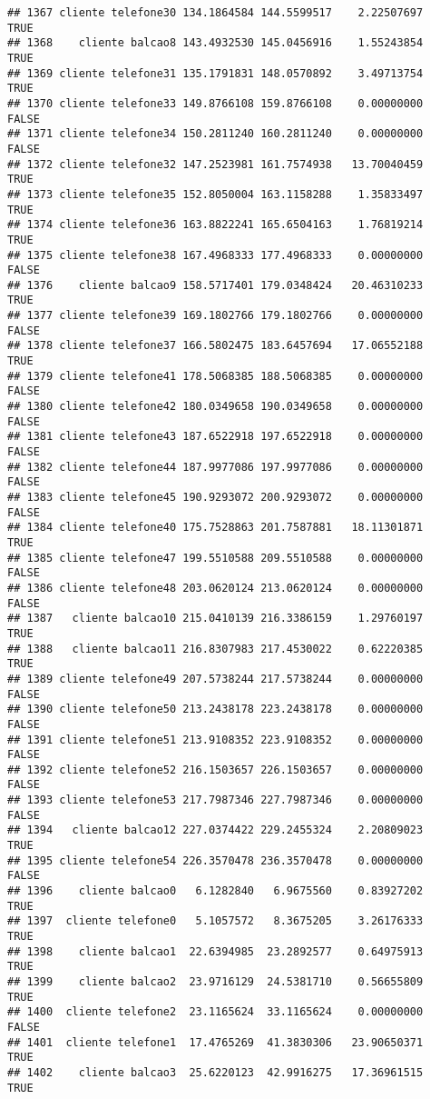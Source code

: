 \documentclass[
]{article}
\begin{document}
\begin{verbatim}
## 1367 cliente telefone30 134.1864584 144.5599517    2.22507697     TRUE
## 1368    cliente balcao8 143.4932530 145.0456916    1.55243854     TRUE
## 1369 cliente telefone31 135.1791831 148.0570892    3.49713754     TRUE
## 1370 cliente telefone33 149.8766108 159.8766108    0.00000000    FALSE
## 1371 cliente telefone34 150.2811240 160.2811240    0.00000000    FALSE
## 1372 cliente telefone32 147.2523981 161.7574938   13.70040459     TRUE
## 1373 cliente telefone35 152.8050004 163.1158288    1.35833497     TRUE
## 1374 cliente telefone36 163.8822241 165.6504163    1.76819214     TRUE
## 1375 cliente telefone38 167.4968333 177.4968333    0.00000000    FALSE
## 1376    cliente balcao9 158.5717401 179.0348424   20.46310233     TRUE
## 1377 cliente telefone39 169.1802766 179.1802766    0.00000000    FALSE
## 1378 cliente telefone37 166.5802475 183.6457694   17.06552188     TRUE
## 1379 cliente telefone41 178.5068385 188.5068385    0.00000000    FALSE
## 1380 cliente telefone42 180.0349658 190.0349658    0.00000000    FALSE
## 1381 cliente telefone43 187.6522918 197.6522918    0.00000000    FALSE
## 1382 cliente telefone44 187.9977086 197.9977086    0.00000000    FALSE
## 1383 cliente telefone45 190.9293072 200.9293072    0.00000000    FALSE
## 1384 cliente telefone40 175.7528863 201.7587881   18.11301871     TRUE
## 1385 cliente telefone47 199.5510588 209.5510588    0.00000000    FALSE
## 1386 cliente telefone48 203.0620124 213.0620124    0.00000000    FALSE
## 1387   cliente balcao10 215.0410139 216.3386159    1.29760197     TRUE
## 1388   cliente balcao11 216.8307983 217.4530022    0.62220385     TRUE
## 1389 cliente telefone49 207.5738244 217.5738244    0.00000000    FALSE
## 1390 cliente telefone50 213.2438178 223.2438178    0.00000000    FALSE
## 1391 cliente telefone51 213.9108352 223.9108352    0.00000000    FALSE
## 1392 cliente telefone52 216.1503657 226.1503657    0.00000000    FALSE
## 1393 cliente telefone53 217.7987346 227.7987346    0.00000000    FALSE
## 1394   cliente balcao12 227.0374422 229.2455324    2.20809023     TRUE
## 1395 cliente telefone54 226.3570478 236.3570478    0.00000000    FALSE
## 1396    cliente balcao0   6.1282840   6.9675560    0.83927202     TRUE
## 1397  cliente telefone0   5.1057572   8.3675205    3.26176333     TRUE
## 1398    cliente balcao1  22.6394985  23.2892577    0.64975913     TRUE
## 1399    cliente balcao2  23.9716129  24.5381710    0.56655809     TRUE
## 1400  cliente telefone2  23.1165624  33.1165624    0.00000000    FALSE
## 1401  cliente telefone1  17.4765269  41.3830306   23.90650371     TRUE
## 1402    cliente balcao3  25.6220123  42.9916275   17.36961515     TRUE

\end{verbatim}
\end{document}
